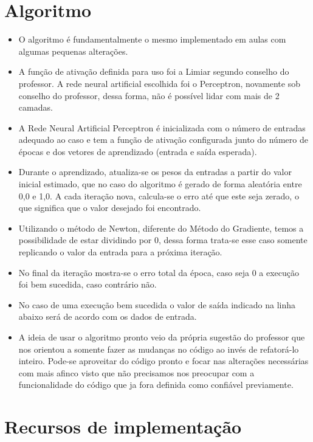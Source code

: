 \documentclass[12pt]{article}
\begin{document}
\section{Algoritmo}

\begin{itemize}
    \item O algoritmo é fundamentalmente o mesmo implementado em aulas com algumas pequenas alterações. 
    \item A função de ativação definida para uso foi a Limiar segundo conselho do professor. A rede neural artificial escolhida foi o Perceptron, novamente sob conselho do professor, dessa forma, não é possível lidar com mais de 2 camadas.
    \item A Rede Neural Artificial Perceptron é inicializada com o número de entradas adequado ao caso e tem a função de ativação configurada junto do número de épocas e dos vetores de aprendizado (entrada e saída esperada).
    \item Durante o aprendizado, atualiza-se os pesos da entradas a partir do valor inicial estimado, que no caso do algoritmo é gerado de forma aleatória entre 0,0 e 1,0. A cada iteração nova, calcula-se o erro até que este seja zerado, o que significa que o valor desejado foi encontrado.
    \item Utilizando o método de Newton, diferente do Método do Gradiente, temos a possibilidade de estar dividindo por 0, dessa forma trata-se esse caso somente replicando o valor da entrada para a próxima iteração.
    \item No final da iteração mostra-se o erro total da época, caso seja 0 a execução foi bem sucedida, caso contrário não.
    \item No caso de uma execução bem sucedida o valor de saída indicado na linha abaixo será de acordo com os dados de entrada.
    \item A ideia de usar o algoritmo pronto veio da própria sugestão do professor que nos orientou a somente fazer as mudanças no código ao invés de refatorá-lo inteiro. Pode-se aproveitar do código pronto e focar nas alterações necessárias com mais afinco visto que não precisamos nos preocupar com a funcionalidade do código que ja fora definida como confiável previamente.
\end{itemize}

\section{Recursos de implementação}
\end{document}
